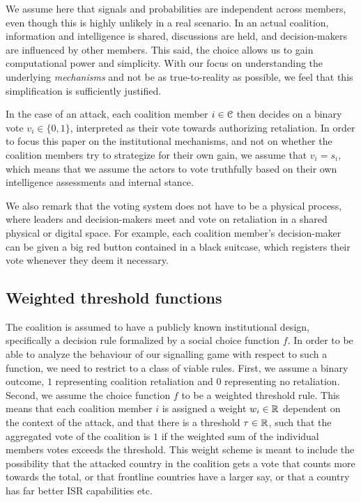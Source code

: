 \begin{remark}
    We assume here that signals and probabilities are independent across members, even though this is highly unlikely in a real scenario. In an actual coalition, information and intelligence is shared, discussions are held, and decision-makers are influenced by other members. This said, the choice allows us to gain computational power and simplicity. With our focus on understanding the underlying \emph{mechanisms} and not be as true-to-reality as possible, we feel that this simplification is sufficiently justified. 
\end{remark} 

In the case of an attack, each coalition member $i\in \EuScript{C}$ then decides on a binary vote $v_i \in \{0,1\}$, interpreted as their vote towards authorizing retaliation. In order to focus this paper on the institutional mechanisms, and not on whether the coalition members try to strategize for their own gain, we assume that $v_i = s_i$, which means that we assume the actors to vote truthfully based on their own intelligence assessments and internal stance. 

\begin{remark}
    We also remark that the voting system does not have to be a physical process, where leaders and decision-makers meet and vote on retaliation in a shared physical or digital space. For example, each coalition member's decision-maker can be given a big red button contained in a black suitcase, which registers their vote whenever they deem it necessary. 
\end{remark}

\subsection{Weighted threshold functions}
\label{ssec:weighted-threshold-functions}
The coalition is assumed to have a publicly known institutional design, specifically a decision rule formalized by a social choice function $f$. In order to be able to analyze the behaviour of our signalling game with respect to such a function, we need to restrict to a class of viable rules. First, we assume a binary outcome, $1$ representing coalition retaliation and $0$ representing no retaliation. Second, we assume the choice function $f$ to be a weighted threshold rule. This means that each coalition member $i$ is assigned a weight $w_i \in \mathbb{R}$ dependent on the context of the attack, and that there is a threshold $\tau \in \mathbb{R}$, such that the aggregated vote of the coalition is $1$ if the weighted sum of the individual members votes exceeds the threshold. This weight scheme is meant to include the possibility that the attacked country in the coalition gets a vote that counts more towards the total, or that frontline countries have a larger say, or that a country has far better ISR capabilities etc. 

